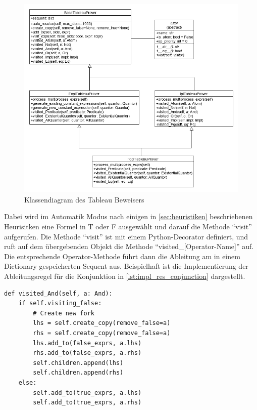 \begin{figure}[h]
\begin{center}
\includegraphics[scale=0.55]{images/class_diag_tableau_prover.png}
\caption{Klassendiagram des Tableau Beweisers}
\label{fig:class_diag_tableau_prover}
\end{center}
\end{figure}

Dabei wird im Automatik Modus nach einigen in \autoref{sec:heuristiken} beschriebenen Heurisitken eine Formel in T oder F ausgewählt und darauf die Methode ``visit'' aufgerufen. Die Methode ``visit'' ist mit einem Python-Decorator definiert, und ruft auf dem übergebenden Objekt die Methode ``visited\_[Operator-Name]'' auf. Die entsprechende Operator-Methode führt dann die Ableitung am in einem Dictionary gespeicherten Sequent aus. Beispielhaft ist die Implementierung der Ableitungsregel für die Konjunktion in \autoref{lst:impl_res_conjunction} dargestellt.

\begin{lstlisting}[caption={Implementierung der Ableitungsregel für die Konjunktion in Aussagenlogik},label=lst:impl_res_conjunction]
def visited_And(self, a: And):
	if self.visiting_false:
		# Create new fork
		lhs = self.create_copy(remove_false=a)
		rhs = self.create_copy(remove_false=a)
		lhs.add_to(false_exprs, a.lhs)
		rhs.add_to(false_exprs, a.rhs)
		self.children.append(lhs)
		self.children.append(rhs)
	else:
		self.add_to(true_exprs, a.lhs)
		self.add_to(true_exprs, a.rhs)
\end{lstlisting}


